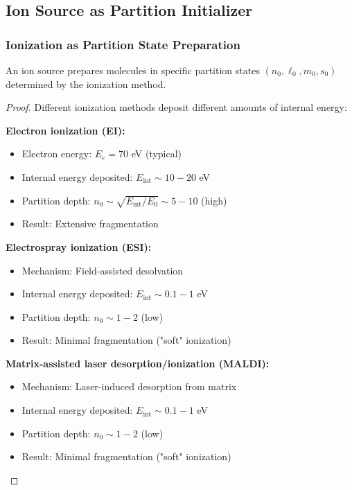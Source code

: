 \subsection{Ion Source as Partition Initializer}

\subsubsection{Ionization as Partition State Preparation}

\begin{theorem}
\label{thm:source_initializer}
An ion source prepares molecules in specific partition states $(n_0, \ell_0, m_0, s_0)$ determined by the ionization method.
\end{theorem}

\begin{proof}
Different ionization methods deposit different amounts of internal energy:

\textbf{Electron ionization (EI):}
\begin{itemize}
    \item Electron energy: $E_e = 70$ eV (typical)
    \item Internal energy deposited: $E_{\text{int}} \sim 10-20$ eV
    \item Partition depth: $n_0 \sim \sqrt{E_{\text{int}}/E_0} \sim 5-10$ (high)
    \item Result: Extensive fragmentation
\end{itemize}

\textbf{Electrospray ionization (ESI):}
\begin{itemize}
    \item Mechanism: Field-assisted desolvation
    \item Internal energy deposited: $E_{\text{int}} \sim 0.1-1$ eV
    \item Partition depth: $n_0 \sim 1-2$ (low)
    \item Result: Minimal fragmentation ("soft" ionization)
\end{itemize}

\textbf{Matrix-assisted laser desorption/ionization (MALDI):}
\begin{itemize}
    \item Mechanism: Laser-induced desorption from matrix
    \item Internal energy deposited: $E_{\text{int}} \sim 0.1-1$ eV
    \item Partition depth: $n_0 \sim 1-2$ (low)
    \item Result: Minimal fragmentation ("soft" ionization)
\end{itemize}


\end{proof}
